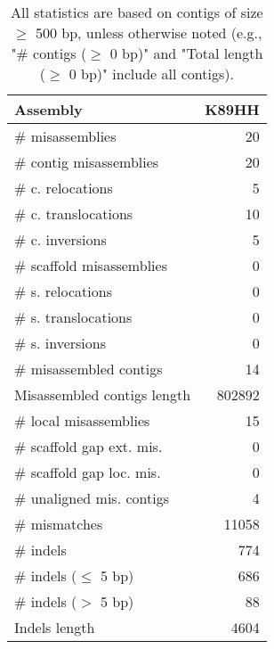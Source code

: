 \documentclass[12pt,a4paper]{article}
\begin{document}
\begin{table}[ht]
\begin{center}
\caption{All statistics are based on contigs of size $\geq$ 500 bp, unless otherwise noted (e.g., "\# contigs ($\geq$ 0 bp)" and "Total length ($\geq$ 0 bp)" include all contigs).}
\begin{tabular}{|l*{1}{|r}|}
\hline
Assembly & K89HH \\ \hline
\# misassemblies & 20 \\ \hline
\hspace{2mm}\# contig misassemblies & 20 \\ \hline
\hspace{5mm}\# c. relocations & 5 \\ \hline
\hspace{5mm}\# c. translocations & 10 \\ \hline
\hspace{5mm}\# c. inversions & 5 \\ \hline
\hspace{2mm}\# scaffold misassemblies & 0 \\ \hline
\hspace{5mm}\# s. relocations & 0 \\ \hline
\hspace{5mm}\# s. translocations & 0 \\ \hline
\hspace{5mm}\# s. inversions & 0 \\ \hline
\# misassembled contigs & 14 \\ \hline
Misassembled contigs length & 802892 \\ \hline
\# local misassemblies & 15 \\ \hline
\# scaffold gap ext. mis. & 0 \\ \hline
\# scaffold gap loc. mis. & 0 \\ \hline
\# unaligned mis. contigs & 4 \\ \hline
\# mismatches & 11058 \\ \hline
\# indels & 774 \\ \hline
\hspace{5mm}\# indels ($\leq$ 5 bp) & 686 \\ \hline
\hspace{5mm}\# indels ($>$ 5 bp) & 88 \\ \hline
Indels length & 4604 \\ \hline
\end{tabular}
\end{center}
\end{table}
\end{document}

